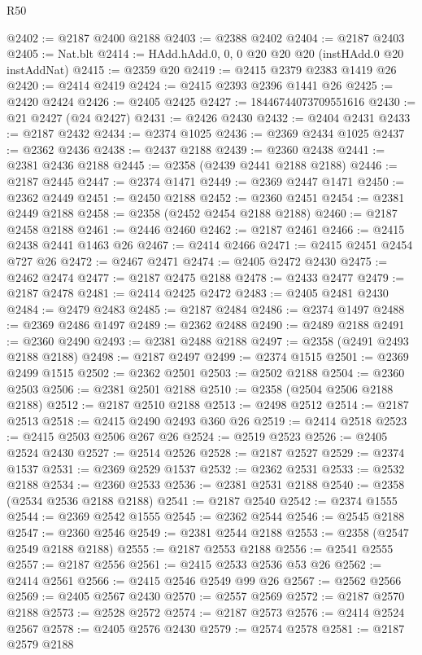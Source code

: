 \begin{lexlean}{R50}
\begin{coremodule}
@2402 := @2187 @2400 @2188
@2403 := @2388 @2402
@2404 := @2187 @2403
@2405 := Nat.blt
@2414 := HAdd.hAdd.{0, 0, 0} @20 @20 @20 (instHAdd.{0} @20 instAddNat)
@2415 := @2359 @20
@2419 := @2415 @2379 @2383 @1419 @26
@2420 := @2414 @2419
@2424 := @2415 @2393 @2396 @1441 @26
@2425 := @2420 @2424
@2426 := @2405 @2425
@2427 := 18446744073709551616
@2430 := @21 @2427 (@24 @2427)
@2431 := @2426 @2430
@2432 := @2404 @2431
@2433 := @2187 @2432
@2434 := @2374 @1025
@2436 := @2369 @2434 @1025
@2437 := @2362 @2436
@2438 := @2437 @2188
@2439 := @2360 @2438
@2441 := @2381 @2436 @2188
@2445 := @2358 (@2439 @2441 @2188 @2188)
@2446 := @2187 @2445
@2447 := @2374 @1471
@2449 := @2369 @2447 @1471
@2450 := @2362 @2449
@2451 := @2450 @2188
@2452 := @2360 @2451
@2454 := @2381 @2449 @2188
@2458 := @2358 (@2452 @2454 @2188 @2188)
@2460 := @2187 @2458 @2188
@2461 := @2446 @2460
@2462 := @2187 @2461
@2466 := @2415 @2438 @2441 @1463 @26
@2467 := @2414 @2466
@2471 := @2415 @2451 @2454 @727 @26
@2472 := @2467 @2471
@2474 := @2405 @2472 @2430
@2475 := @2462 @2474
@2477 := @2187 @2475 @2188
@2478 := @2433 @2477
@2479 := @2187 @2478
@2481 := @2414 @2425 @2472
@2483 := @2405 @2481 @2430
@2484 := @2479 @2483
@2485 := @2187 @2484
@2486 := @2374 @1497
@2488 := @2369 @2486 @1497
@2489 := @2362 @2488
@2490 := @2489 @2188
@2491 := @2360 @2490
@2493 := @2381 @2488 @2188
@2497 := @2358 (@2491 @2493 @2188 @2188)
@2498 := @2187 @2497
@2499 := @2374 @1515
@2501 := @2369 @2499 @1515
@2502 := @2362 @2501
@2503 := @2502 @2188
@2504 := @2360 @2503
@2506 := @2381 @2501 @2188
@2510 := @2358 (@2504 @2506 @2188 @2188)
@2512 := @2187 @2510 @2188
@2513 := @2498 @2512
@2514 := @2187 @2513
@2518 := @2415 @2490 @2493 @360 @26
@2519 := @2414 @2518
@2523 := @2415 @2503 @2506 @267 @26
@2524 := @2519 @2523
@2526 := @2405 @2524 @2430
@2527 := @2514 @2526
@2528 := @2187 @2527
@2529 := @2374 @1537
@2531 := @2369 @2529 @1537
@2532 := @2362 @2531
@2533 := @2532 @2188
@2534 := @2360 @2533
@2536 := @2381 @2531 @2188
@2540 := @2358 (@2534 @2536 @2188 @2188)
@2541 := @2187 @2540
@2542 := @2374 @1555
@2544 := @2369 @2542 @1555
@2545 := @2362 @2544
@2546 := @2545 @2188
@2547 := @2360 @2546
@2549 := @2381 @2544 @2188
@2553 := @2358 (@2547 @2549 @2188 @2188)
@2555 := @2187 @2553 @2188
@2556 := @2541 @2555
@2557 := @2187 @2556
@2561 := @2415 @2533 @2536 @53 @26
@2562 := @2414 @2561
@2566 := @2415 @2546 @2549 @99 @26
@2567 := @2562 @2566
@2569 := @2405 @2567 @2430
@2570 := @2557 @2569
@2572 := @2187 @2570 @2188
@2573 := @2528 @2572
@2574 := @2187 @2573
@2576 := @2414 @2524 @2567
@2578 := @2405 @2576 @2430
@2579 := @2574 @2578
@2581 := @2187 @2579 @2188

\end{coremodule}
\end{lexlean}
